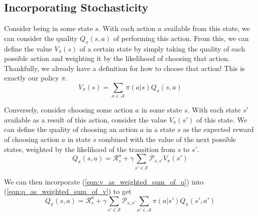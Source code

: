 \documentclass[journal, onecolumn, 12pt, draftclsnofoot]{IEEEtran}
\numberwithin{equation}{section}
\newcommand{\mc}[1]{\mathcal{#1}}
\begin{document}
		\subsection{Incorporating Stochasticity}
		\par Consider being in some state $s$. With each action $a$ available from this state, we can consider the quality $Q_\pi(s,a)$ of performing this action. From this, we can define the value $V_\pi(s)$ of a certain state by simply taking the quality of each possible action and weighting it by the likelihood of choosing that action. Thankfully, we already have a definition for how to choose that action! This is exactly our policy $\pi$.
		\begin{equation}
			\label{eqn:v_as_weighted_sum_of_q}
			V_\pi(s) = \sum_{a \in \mc{A}} \pi(a \vert s) Q_\pi(s, a)
		\end{equation}
		\par Conversely, consider choosing some action $a$ in some state $s$. With each state $s'$ available as a result of this action, consider the value $V_\pi(s')$ of this state. We can define the quality of choosing an action $a$ in a state $s$ as the expected reward of choosing action $a$ in state $s$ combined with the value of the next possible states, weighted by the likelihood of the transition from $s$ to $s'$.
		\begin{equation}
			\label{eqn:q_as_weighted_sum_of_v}
			Q_\pi(s,a) = \mc{R}_s^a + \gamma \sum_{s' \in \mc{S}} \mc{P}_{s,s'}V_\pi(s')
		\end{equation}

		We can then incorporate (\ref{eqn:v_as_weighted_sum_of_q}) into (\ref{eqn:q_as_weighted_sum_of_v}) to get
		\begin{equation}
			\label{eqn:q_recursive_with_probabilities}
			Q_\pi(s,a) = \mc{R}_s^a + \gamma \sum_{s' \in \mc{S}} \mc{P}_{s,s'}\sum_{a' \in \mc{A}} \pi(a \vert s') Q_\pi(s', a')
		\end{equation}
\end{document}
